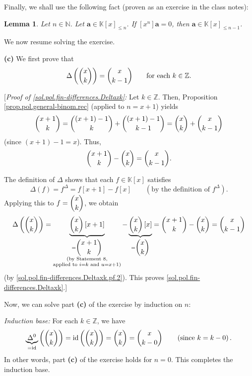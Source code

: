\documentclass[paper=a4, fontsize=12pt]{scrartcl}%
\theoremstyle{plainsl}
\newtheorem{lemma}[theorem]{Lemma}
\theoremstyle{definition}
\theoremstyle{remark}
\begin{document}
\bigskip

Finally, we shall use the following fact (proven as an exercise in the class notes):

\begin{lemma}
\label{lem.sol.pol.fin-differences.deg-reduce}Let $n\in\mathbb{N}$. Let
$\mathbf{a}\in\mathbb{K}\left[  x\right]  _{\leq n}$. If $\left[
x^{n}\right]  \mathbf{a}=0$, then $\mathbf{a}\in\mathbb{K}\left[  x\right]
_{\leq n-1}$.
\end{lemma}

\bigskip

We now resume solving the exercise.

\bigskip

\textbf{(c)} We first prove that
\begin{equation}
\Delta\left(  \dbinom{x}{k}\right)  =\dbinom{x}{k-1}\qquad\text{for each }%
k\in\mathbb{Z}\text{.} \label{sol.pol.fin-differences.Deltaxk}%
\end{equation}


[\textit{Proof of \eqref{sol.pol.fin-differences.Deltaxk}:} Let $k\in
\mathbb{Z}$. Then, Proposition \ref{prop.pol.general-binom.rec} (applied to
$n=x+1$) yields%
\[
\dbinom{x+1}{k}=\dbinom{\left(  x+1\right)  -1}{k}+\dbinom{\left(  x+1\right)
-1}{k-1}=\dbinom{x}{k}+\dbinom{x}{k-1}%
\]
(since $\left(  x+1\right)  -1=x$). Thus,%
\begin{equation}
\dbinom{x+1}{k}-\dbinom{x}{k}=\dbinom{x}{k-1}.
\label{sol.pol.fin-differences.Deltaxk.pf.2}%
\end{equation}


The definition of $\Delta$ shows that each $f\in\mathbb{K}\left[  x\right]  $
satisfies%
\[
\Delta\left(  f\right)  =f^{\Delta}=f\left[  x+1\right]  -f\left[  x\right]
\qquad\left(  \text{by the definition of }f^{\Delta}\right)  .
\]
Applying this to $f=\dbinom{x}{k}$, we obtain%
\[
\Delta\left(  \dbinom{x}{k}\right)  =\underbrace{\dbinom{x}{k}\left[
x+1\right]  }_{\substack{_{\substack{=\dbinom{x+1}{k}}}\\\text{(by Statement
8,}\\\text{applied to }i=k\text{ and }u=x+1\text{)}}}-\underbrace{\dbinom
{x}{k}\left[  x\right]  }_{=\dbinom{x}{k}}=\dbinom{x+1}{k}-\dbinom{x}%
{k}=\dbinom{x}{k-1}%
\]
(by \eqref{sol.pol.fin-differences.Deltaxk.pf.2}). This proves \eqref{sol.pol.fin-differences.Deltaxk}.]

Now, we can solve part \textbf{(c)} of the exercise by induction on $n$:

\textit{Induction base:} For each $k\in\mathbb{Z}$, we have%
\[
\underbrace{\Delta^{0}}_{=\operatorname*{id}}\left(  \dbinom{x}{k}\right)
=\operatorname*{id}\left(  \dbinom{x}{k}\right)  =\dbinom{x}{k}=\dbinom
{x}{k-0}\qquad\left(  \text{since }k=k-0\right)  .
\]
In other words, part \textbf{(c)} of the exercise holds for $n=0$. This
completes the induction base.
\end{document}
